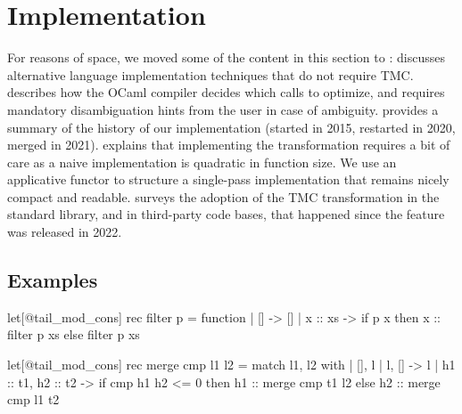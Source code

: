 \section{\OCaml Implementation}
\label{sec:implementation}

For reasons of space, we moved some of the content in this section to :
%
  discusses alternative language implementation techniques that do not require TMC.
%
  describes how the OCaml compiler decides which calls to optimize,
  and requires mandatory disambiguation hints from the user in case of ambiguity.
%
 provides a summary of the history of our implementation (started in 2015, restarted in 2020, merged in 2021).
%
 explains that implementing the transformation requires a bit of care as a naive implementation is quadratic in function size. We use an applicative functor to structure a single-pass implementation that remains nicely compact and readable.
%
 surveys the adoption of the TMC transformation in the standard library,
  and in third-party \OCaml code bases, that happened since the feature was released in 2022.

\subsection{Examples}
\label{subsec:ocaml-examples}


\begin{minipage}{0.47\linewidth}
\begin{Ocaml}
let[@tail_mod_cons] rec filter p =
  function
  | [] -> []
  | x :: xs ->
    if p x
    then x :: filter p xs
    else filter p xs
\end{Ocaml}
\end{minipage}
\hfill
\begin{minipage}{0.53\linewidth}
\begin{Ocaml}
let[@tail_mod_cons] rec merge cmp l1 l2 =
  match l1, l2 with
  | [], l | l, [] -> l
  | h1 :: t1, h2 :: t2 ->
      if cmp h1 h2 <= 0
      then h1 :: merge cmp t1 l2
      else h2 :: merge cmp l1 t2
\end{Ocaml}
\end{minipage}

